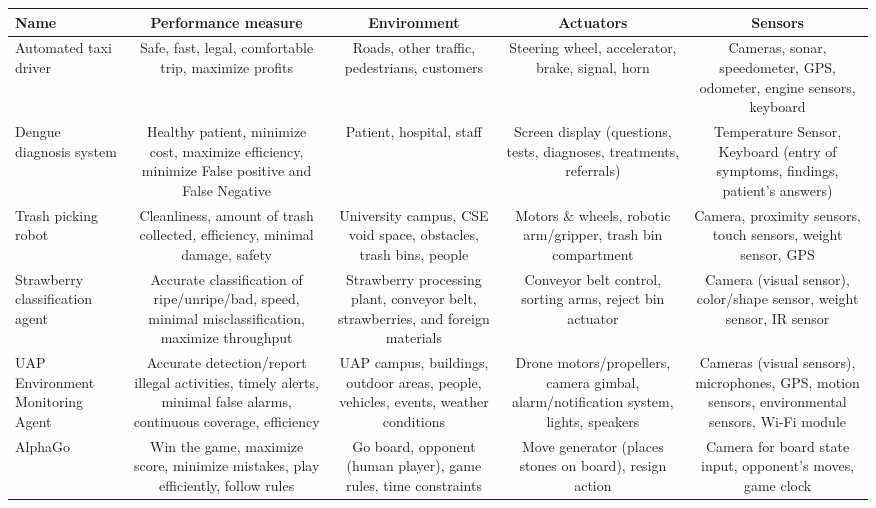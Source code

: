 \begin{tabularx}{\textwidth}
{|>{\centering\arraybackslash}p{2cm}|C|C|C|C|}\hline
   \textbf{Name} & \textbf{Performance measure} & \textbf{Environment} & \textbf{Actuators} & \textbf{Sensors} \\\hline
   
   Automated taxi driver 
   & Safe, fast, legal, comfortable trip, maximize profits 
   & Roads, other traffic, pedestrians, customers 
   & Steering wheel, accelerator, brake, signal, horn 
   & Cameras, sonar, speedometer, GPS, odometer, engine sensors, keyboard \\\hline

   Dengue diagnosis system
   & Healthy patient, minimize cost, maximize efficiency, minimize False positive and False Negative
   & Patient, hospital, staff
   & Screen display (questions, tests, diagnoses, treatments, referrals)
   & Temperature Sensor, Keyboard (entry of symptoms, findings, patient's answers)
   \\\hline

   Trash picking robot
   & Cleanliness, amount of trash collected, efficiency, minimal damage, safety
   & University campus, CSE void space, obstacles, trash bins, people
   & Motors \& wheels, robotic arm/gripper, trash bin compartment
   & Camera, proximity sensors, touch sensors, weight sensor, GPS
   \\\hline

   Strawberry classification agent
   & Accurate classification of ripe/unripe/bad, speed, minimal misclassification, maximize throughput
   & Strawberry processing plant, conveyor belt, strawberries, and foreign materials
   & Conveyor belt control, sorting arms, reject bin actuator
   & Camera (visual sensor), color/shape sensor, weight sensor, IR sensor
   \\\hline

   UAP Environment Monitoring Agent
   & Accurate detection/report illegal activities, timely alerts, minimal false alarms, continuous coverage, efficiency
   & UAP campus, buildings, outdoor areas, people, vehicles, events, weather conditions
   & Drone motors/propellers, camera gimbal, alarm/notification system, lights, speakers
   & Cameras (visual sensors), microphones, GPS, motion sensors, environmental sensors, Wi-Fi module
   \\\hline

   AlphaGo
   & Win the game, maximize score, minimize mistakes, play efficiently, follow rules
   & Go board, opponent (human player), game rules, time constraints
   & Move generator (places stones on board), resign action
   & Camera for board state input, opponent's moves, game clock
   \\\hline
\end{tabularx}